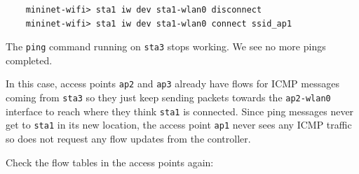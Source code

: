 \begin{verbatim}
    mininet-wifi> sta1 iw dev sta1-wlan0 disconnect
    mininet-wifi> sta1 iw dev sta1-wlan0 connect ssid_ap1
\end{verbatim}

The \texttt{ping} command running on \texttt{sta3} stops working. We see no more pings completed.

In this case, access points \texttt{ap2} and \texttt{ap3} already have flows for ICMP messages coming from \texttt{sta3} so they just keep sending packets towards the \texttt{ap2-wlan0} interface to reach where they think \texttt{sta1} is connected. Since ping messages never get to \texttt{sta1} in its new location, the access point \texttt{ap1} never sees any ICMP traffic so does not request any flow updates from the controller.

Check the flow tables in the access points again: 

